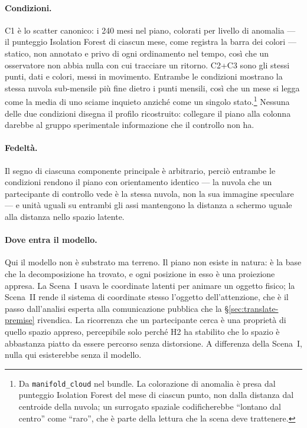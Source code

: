 \paragraph{Condizioni.} C1 è lo scatter canonico: i 240 mesi nel piano, colorati per livello di anomalia --- il punteggio Isolation Forest di ciascun mese, come registra la barra dei colori --- statico, non annotato e privo di ogni ordinamento nel tempo, così che un osservatore non abbia nulla con cui tracciare un ritorno. C2+C3 sono gli stessi punti, dati e colori, messi in movimento. Entrambe le condizioni mostrano la stessa nuvola sub-mensile più fine dietro i punti mensili, così che un mese si legga come la media di uno sciame inquieto anziché come un singolo stato.\footnote{Da \texttt{manifold\_cloud} nel bundle. La colorazione di anomalia è presa dal punteggio Isolation Forest del mese di ciascun punto, non dalla distanza dal centroide della nuvola; un surrogato spaziale codificherebbe ``lontano dal centro'' come ``raro'', che è parte della lettura che la scena deve trattenere.} Nessuna delle due condizioni disegna il profilo ricostruito: collegare il piano alla colonna darebbe al gruppo sperimentale informazione che il controllo non ha.

\paragraph{Fedeltà.} Il segno di ciascuna componente principale è arbitrario, perciò entrambe le condizioni rendono il piano con orientamento identico --- la nuvola che un partecipante di controllo vede è la stessa nuvola, non la sua immagine speculare --- e unità uguali su entrambi gli assi mantengono la distanza a schermo uguale alla distanza nello spazio latente.

\paragraph{Dove entra il modello.} Qui il modello non è substrato ma terreno. Il piano non esiste in natura: è la base che la decomposizione ha trovato, e ogni posizione in esso è una proiezione appresa. La Scena~I usava le coordinate latenti per animare un oggetto fisico; la Scena~II rende il sistema di coordinate stesso l'oggetto dell'attenzione, che è il passo dall'analisi esperta alla comunicazione pubblica che la \S\ref{sec:translate-premise} rivendica. La ricorrenza che un partecipante cerca è una proprietà di quello spazio appreso, percepibile solo perché H2 ha stabilito che lo spazio è abbastanza piatto da essere percorso senza distorsione. A differenza della Scena~I, nulla qui esisterebbe senza il modello.

